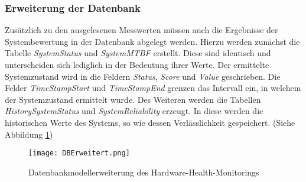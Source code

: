 \subsubsection*{Erweiterung der Datenbank}
Zusätzlich zu den ausgelesenen Messwerten müssen auch die Ergebnisse der Systembewertung in der Datenbank abgelegt werden. 
Hierzu werden zunächst die Tabelle \textit{SystemStatus} und \textit{SystemMTBF} erstellt. Diese sind identisch und unterscheiden sich lediglich in der Bedeutung ihrer Werte. Der ermittelte Systemzustand wird in die Feldern \textit{Status}, \textit{Score} und \textit{Value} geschrieben. Die Felder \textit{TimeStampStart} und \textit{TimeStampEnd} grenzen das Intervall ein, in welchem der Systemzustand ermittelt wurde. Des Weiteren werden die Tabellen \textit{HistorySystemStatus} und \textit{SystemReliability} erzeugt. In diese werden die historischen Werte des Systems, so wie dessen Verlässlichkeit gespeichert. (Siehe Abbildung \ref{fig:DBModellErweitert})   
\begin{center}
    \begin{figure}[h!]
        \centering
        \texttt{[image: DBErweitert.png]}
        \caption{Datenbankmodellerweiterung des Hardware-Health-Monitorings}
        \label{fig:DBModellErweitert}
    \end{figure}
\end{center}
\vspace{-1.8cm}

